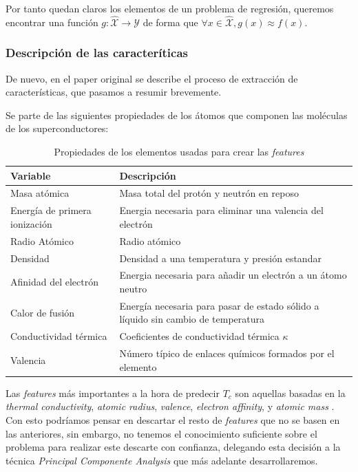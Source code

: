 \documentclass[11pt]{article}
\begin{document}
Por tanto quedan claros los elementos de un problema de regresión, queremos encontrar una función $g: \hat{\mathcal{X}} \rightarrow \mathcal{Y}$ de forma que $\forall x \in \hat{\mathcal{X}}, g(x) \approx f(x)$.

\subsubsection{Descripción de las caracteríticas} \label{descripcion_caracteristicas}

De nuevo, en el paper original \cite{original_paper_reg:paper} se describe el proceso de extracción de características, que pasamos a resumir brevemente.

Se parte de las siguientes propiedades de los átomos que componen las moléculas de los superconductores:

\begin{table}[H]
\begin{tabularx}{\textwidth}{|X|X|}
    \textbf{Variable} & \textbf{Descripción} \\
    \hline
    Masa atómica & Masa total del protón y neutrón en reposo \\
    Energía de primera ionización & Energia necesaria para eliminar una valencia del electrón \\
    Radio Atómico & Radio atómico \\
    Densidad & Densidad a una temperatura y presión estandar \\
    Afinidad del electrón & Energia necesaria para añadir un electrón a un átomo neutro \\
    Calor de fusión & Energía necesaria para pasar de estado sólido a líquido sin cambio de temperatura \\
    Conductividad térmica &  Coeficientes de conductividad térmica $\kappa$ \\
    Valencia & Número típico de enlaces químicos formados por el elemento \\
    \hline
\end{tabularx}
\caption{Propiedades de los elementos usadas para crear las \emph{features} }
\end{table}

Las \emph{features} más importantes a la hora de predecir $T_c$ son aquellas basadas en la \emph{thermal conductivity}, \emph{atomic radius}, \emph{valence}, \emph{electron affinity}, y \emph{atomic mass} \cite{original_paper_reg:paper}. Con esto podríamos pensar en descartar el resto de \emph{features} que no se basen en las anteriores, sin embargo, no tenemos el conocimiento suficiente sobre el problema para realizar este descarte con confianza, delegando esta decisión a la técnica \emph{Principal Componente Analysis} que más adelante desarrollaremos.
\end{document}
